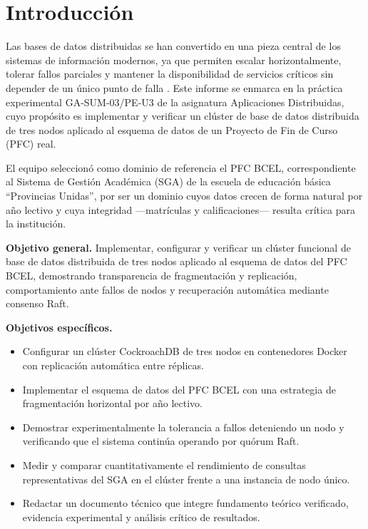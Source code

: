 \documentclass[10pt,a4paper]{article}
\begin{document}
\section{Introducción}
 
Las bases de datos distribuidas se han convertido en una pieza central de
los sistemas de información modernos, ya que permiten escalar
horizontalmente, tolerar fallos parciales y mantener la disponibilidad de
servicios críticos sin depender de un único punto de falla
\cite{ozsu2020,kleppmann2017}. Este informe se enmarca en la práctica
experimental GA-SUM-03/PE-U3 de la asignatura Aplicaciones Distribuidas,
cuyo propósito es implementar y verificar un clúster de base de datos
distribuida de tres nodos aplicado al esquema de datos de un Proyecto de
Fin de Curso (PFC) real.
 
El equipo seleccionó como dominio de referencia el PFC BCEL,
correspondiente al Sistema de Gestión Académica (SGA) de la escuela de
educación básica ``Provincias Unidas'', por ser un dominio cuyos datos
crecen de forma natural por año lectivo y cuya integridad —matrículas y
calificaciones— resulta crítica para la institución.
 
\textbf{Objetivo general.} Implementar, configurar y verificar un clúster
funcional de base de datos distribuida de tres nodos aplicado al esquema
de datos del PFC BCEL, demostrando transparencia de fragmentación y
replicación, comportamiento ante fallos de nodos y recuperación automática
mediante consenso Raft.
 
\textbf{Objetivos específicos.}
\begin{itemize}
  \item Configurar un clúster CockroachDB de tres nodos en contenedores
        Docker con replicación automática entre réplicas.
  \item Implementar el esquema de datos del PFC BCEL con una estrategia de
        fragmentación horizontal por año lectivo.
  \item Demostrar experimentalmente la tolerancia a fallos deteniendo un
        nodo y verificando que el sistema continúa operando por quórum
        Raft.
  \item Medir y comparar cuantitativamente el rendimiento de consultas
        representativas del SGA en el clúster frente a una instancia de
        nodo único.
  \item Redactar un documento técnico que integre fundamento teórico
        verificado, evidencia experimental y análisis crítico de
        resultados.
\end{itemize}
\end{document}
